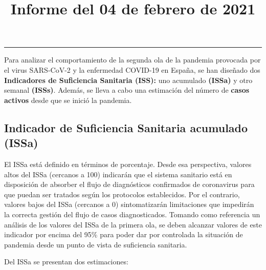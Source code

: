 \documentclass[
  11pt,
]{article}
\title{Informe del 04 de febrero de 2021}
\author{}
\date{\vspace{-2.5em}}
\begin{document}
\maketitle

\renewcommand{\figurename}{Figura}
\renewcommand{\tablename}{Tabla}

\tableofcontents

\vspace{.5cm}

\begin{center}\rule{0.5\linewidth}{0.5pt}\end{center}

\vspace{.5cm}

Para analizar el comportamiento de la segunda ola de la pandemia
provocada por el virus SARS-CoV-2 y la enfermedad COVID-19 en España, se
han diseñado dos \textbf{Indicadores de Suficiencia Sanitaria (ISS):}
uno acumulado \textbf{(ISSa)} y otro semanal \textbf{(ISSs)}. Además, se
lleva a cabo una estimación del número de \textbf{casos activos} desde
que se inició la pandemia.

\hypertarget{indicador-de-suficiencia-sanitaria-acumulado-issa}{%
\subsection{Indicador de Suficiencia Sanitaria acumulado
(ISSa)}\label{indicador-de-suficiencia-sanitaria-acumulado-issa}}

El ISSa está definido en términos de porcentaje. Desde esa perspectiva,
valores altos del ISSa (cercanos a 100) indicarán que el sistema
sanitario está en disposición de absorber el flujo de diagnósticos
confirmados de coronavirus para que puedan ser tratados según los
protocolos establecidos. Por el contrario, valores bajos del ISSa
(cercanos a 0) sintomatizarán limitaciones que impedirán la correcta
gestión del flujo de casos diagnosticados. Tomando como referencia un
análisis de los valores del ISSa de la primera ola, se deben alcanzar
valores de este indicador por encima del 95\% para poder dar por
controlada la situación de pandemia desde un punto de vista de
suficiencia sanitaria.

Del ISSa se presentan dos estimaciones:
\end{document}
